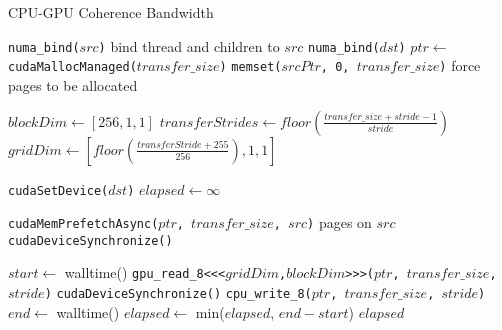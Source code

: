 \begin{algorithm}
    \caption{CPU-GPU Coherence Bandwidth}
    \label{alg:um-coherence-bw}
    \begin{algorithmic}[1]
    \Statex

            \State \texttt{numa\_bind($src$)} \Comment bind thread and children to $src$
        \EndIf
        \State \texttt{numa\_bind($dst$)}
        \EndIf
        \State $ptr \gets$ \texttt{cudaMallocManaged($transfer\_size$)}
        \State \texttt{memset($srcPtr$, 0, $transfer\_size$)} \Comment force pages to be allocated
        

        \State $blockDim \gets [256,1,1]$
        \State $transferStrides \gets floor(\frac{transfer\_size + stride - 1}{stride})$
        \State $gridDim \gets [floor(\frac{transferStride + 255}{256}), 1, 1]$

            \State \texttt{cudaSetDevice($dst$)}
        \EndIf
        \State $elapsed \gets \infty$

            \State \texttt{cudaMemPrefetchAsync($ptr$, $transfer\_size$, $src$)} \Comment pages on $src$
            \State \texttt{cudaDeviceSynchronize()}

            \State $start \gets$ walltime()
                \State \texttt{gpu\_read\_8<<<$gridDim$,$blockDim$>>>($ptr$, $transfer\_size$, $stride$)}
                \State \texttt{cudaDeviceSynchronize()}
            \Else
                \State \texttt{cpu\_write\_8($ptr$, $transfer\_size$, $stride$)}
            \EndIf
            \State $end \gets$ walltime()
            \State $elapsed \gets$ min($elapsed$, $end-start$)
        \EndFor
        \State \Return $elapsed$
    \EndFunction

    \end{algorithmic}
\end{algorithm}

